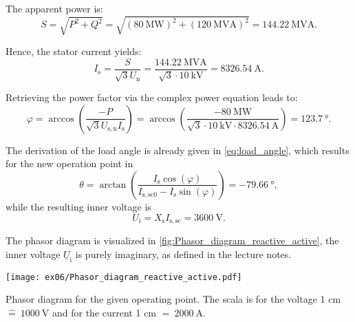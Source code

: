 \begin{solutionblock}
    
    The apparent power is:
    \begin{equation}
        S = \sqrt{P^2+Q^2}
        = \sqrt{\left(\SI{80}{\mega\watt}\right)^2 + \left(\SI{120}{\mega\volt\ampere}\right)^2}
        = \SI{144.22}{\mega\volt\ampere}.
    \end{equation}

    Hence, the stator current yields:
    \begin{equation}
        I_{\mathrm{s}} = \frac{S}{\sqrt{3}U_{\mathrm{n}}}
        = \frac{\SI{144.22}{\mega\volt\ampere}}{\sqrt{3}\cdot\SI{10}{\kilo\volt}}
        = \SI{8326.54}{\ampere}.
    \end{equation}

    Retrieving the power factor via the complex power equation leads to:
    \begin{equation}
        \varphi = \arccos\left(\frac{-P}{\sqrt{3}U_{\mathrm{s,n}}I_{\mathrm{s}}} \right)
        = \arccos\left(\frac{-\SI{80}{\mega\watt}}{\sqrt{3}\cdot\SI{10}{\kilo\volt}\cdot\SI{8326.54}{\ampere}}\right)
        = \SI{123.7}{\degree}.
    \end{equation}

    The derivation of the load angle is already given in \eqref{eq:load_angle}, which results for the new operation point in
    \begin{equation}
        \theta = \arctan\left(\frac{I_{\mathrm{s}}\cos(\varphi)}{I_{\mathrm{s,sc0}}-I_{\mathrm{s}}\sin(\varphi)}\right)
        = \SI{-79.66}{\degree},
    \end{equation}
    while the resulting inner voltage is
    \begin{equation}
        U_{\mathrm{i}} = X_{\mathrm{s}} I_{\mathrm{s,sc}}
        = \SI{3600}{\volt}.
    \end{equation}

    The phasor diagram is visualized in \autoref{fig:Phasor_diagram_reactive_active}, the inner voltage $\underline{U}_{\mathrm{i}}$ is purely imaginary, as defined in the lecture notes.
    \begin{solutionfigure}
        \centering
        \texttt{[image: ex06/Phasor\_diagram\_reactive\_active.pdf]}
        \caption{Phasor diagram for the given operating point. The scala is for the voltage 1 cm $\widehat{=}~ \SI{1000}{\volt}$ and for the current 1 cm $\widehat{=}~ \SI{2000}{\ampere}$.}
        \label{fig:Phasor_diagram_reactive_active}
    \end{solutionfigure}


\end{solutionblock}



